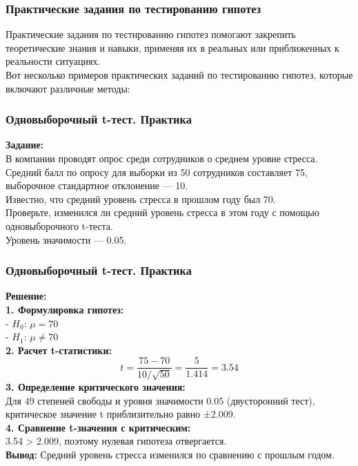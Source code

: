 \documentclass[aspectratio=169]{beamer}
\begin{document}
\begin{frame}
\frametitle{Практические задания по тестированию гипотез}
Практические задания по тестированию гипотез помогают закрепить теоретические знания и навыки, применяя их в реальных или приближенных к реальности ситуациях.\\
Вот несколько примеров практических заданий по тестированию гипотез, которые включают различные методы:
\end{frame}

\begin{frame}
\frametitle{Одновыборочный t-тест. Практика}
{\bf Задание:}\\
В компании проводят опрос среди сотрудников о среднем уровне стресса.\\
Средний балл по опросу для выборки из 50 сотрудников составляет 75, выборочное стандартное отклонение — 10.\\
Известно, что средний уровень стресса в прошлом году был 70.\\
Проверьте, изменился ли средний уровень стресса в этом году с помощью одновыборочного t-теста.\\
Уровень значимости — 0.05.
\end{frame}

\begin{frame}
\frametitle{Одновыборочный t-тест. Практика}
{\bf Решение:}\\
{\bf 1. Формулировка гипотез:}\\
- $H_0$: \( \mu = 70 \)\\
- $H_1$: \( \mu \ne 70 \)\\
{\bf 2. Расчет t-статистики:}\\
   \[
   t = \frac{75 - 70}{10 / \sqrt{50}} = \frac{5}{1.414} = 3.54
   \]
{\bf 3. Определение критического значения:}\\
Для 49 степеней свободы и уровня значимости 0.05 (двусторонний тест), критическое значение t приблизительно равно ±2.009.\\
{\bf 4. Сравнение t-значения с критическим:}\\
3.54 > 2.009, поэтому нулевая гипотеза отвергается.
\newline\\
{\bf Вывод:} Средний уровень стресса изменился по сравнению с прошлым годом.
\end{frame}
\end{document}
